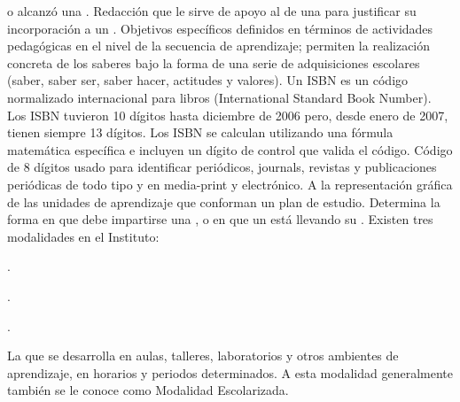 \begin{bGlosario}
	o alcanzó una .%
 	 Redacción que le sirve de apoyo al  de una 
	para justificar su incorporación a un .
	 Objetivos  específicos  definidos  en términos  de  actividades
	pedagógicas  en  el  nivel  de  la  secuencia de  aprendizaje;  permiten  la realización  concreta  de  los  saberes  bajo  la  forma
	de una  serie  de  adquisiciones  escolares (saber, saber ser, saber hacer, actitudes y valores).
 	 Un ISBN es un código normalizado internacional para libros (International Standard Book Number). Los ISBN
	tuvieron 10 dígitos hasta diciembre de 2006 pero, desde enero de 2007, tienen siempre 13 dígitos. Los ISBN se calculan utilizando una
	fórmula matemática específica e incluyen un dígito de control que valida el código.
 	 Código de 8 dígitos usado para identificar periódicos, journals, revistas y publicaciones periódicas de todo tipo y
	en media-print y electrónico.
 	 A la representación gráfica de las unidades de aprendizaje que conforman un plan de estudio.
 	 Determina la forma en que debe impartirse una ,  o
	en que un  está llevando su . Existen tres modalidades en el Instituto:
 	\begin{Citemize}
 		\item {}.
 		\item {}.
 		\item {}.
 	\end{Citemize}
	  La que se desarrolla en aulas, talleres, laboratorios y otros ambientes de aprendizaje, en
	horarios y periodos determinados. A esta modalidad generalmente también se le conoce como Modalidad Escolarizada.

\end{bGlosario}

